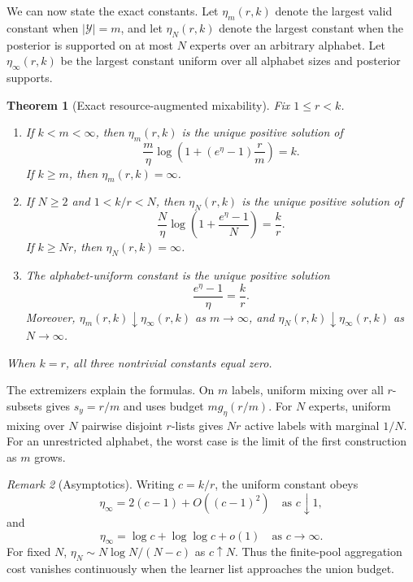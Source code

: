\documentclass{article}
\newtheorem{theorem}{Theorem}
\theoremstyle{definition}
\theoremstyle{remark}
\newtheorem{remark}[theorem]{Remark}
\newcommand{\cY}{\mathcal Y}
\newcommand{\1}{\mathbf 1}
\begin{document}
We can now state the exact constants. Let \(\eta_m(r,k)\) denote the largest valid constant when \(|\cY|=m\), and let \(\eta_N(r,k)\) denote the largest constant when the posterior is supported on at most \(N\) experts over an arbitrary alphabet. Let \(\eta_\infty(r,k)\) be the largest constant uniform over all alphabet sizes and posterior supports.

\begin{theorem}[Exact resource-augmented mixability]
\label{thm:exact}
Fix \(1\le r<k\).
\begin{enumerate}
\item If \(k<m<\infty\), then \(\eta_m(r,k)\) is the unique positive solution of
\begin{equation}
\label{eq:finite-m}
\frac m\eta\log\left(1+(e^\eta-1)\frac rm\right)=k.
\end{equation}
If \(k\ge m\), then \(\eta_m(r,k)=\infty\).
\item If \(N\ge2\) and \(1<k/r<N\), then \(\eta_N(r,k)\) is the unique positive solution of
\begin{equation}
\label{eq:finite-n}
\frac N\eta\log\left(1+\frac{e^\eta-1}{N}\right)=\frac kr.
\end{equation}
If \(k\ge Nr\), then \(\eta_N(r,k)=\infty\).
\item The alphabet-uniform constant is the unique positive solution
\begin{equation}
\label{eq:infinite}
\frac{e^\eta-1}{\eta}=\frac kr.
\end{equation}
Moreover, \(\eta_m(r,k)\downarrow\eta_\infty(r,k)\) as \(m\to\infty\), and \(\eta_N(r,k)\downarrow\eta_\infty(r,k)\) as \(N\to\infty\).
\end{enumerate}
When \(k=r\), all three nontrivial constants equal zero.
\end{theorem}

The extremizers explain the formulas. On \(m\) labels, uniform mixing over all \(r\)-subsets gives \(s_y=r/m\) and uses budget \(m g_\eta(r/m)\). For \(N\) experts, uniform mixing over \(N\) pairwise disjoint \(r\)-lists gives \(Nr\) active labels with marginal \(1/N\). For an unrestricted alphabet, the worst case is the limit of the first construction as \(m\) grows.

\begin{remark}[Asymptotics]
\label{rem:asymptotics}
Writing \(c=k/r\), the uniform constant obeys \[ \eta_\infty=2(c-1)+O((c-1)^2) \quad\text{as }c\downarrow1, \] and \[ \eta_\infty=\log c+\log\log c+o(1) \quad\text{as }c\to\infty. \] For fixed \(N\), \(\eta_N\sim N\log N/(N-c)\) as \(c\uparrow N\). Thus the finite-pool aggregation cost vanishes continuously when the learner list approaches the union budget.
\end{remark}
\end{document}
